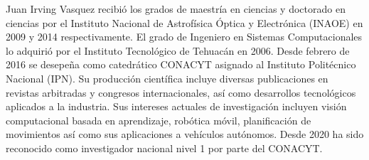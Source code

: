Juan Irving Vasquez recibió los grados de maestría en ciencias y doctorado en ciencias por el Instituto Nacional de Astrofísica Óptica y Electrónica (INAOE) en 2009 y 2014 respectivamente. El grado de Ingeniero en Sistemas Computacionales lo adquirió por el Instituto Tecnológico de Tehuacán en 2006. Desde febrero de 2016 se desepeña como catedrático CONACYT asignado al Instituto Politécnico Nacional (IPN). Su producción científica incluye diversas publicaciones en revistas arbitradas y congresos internacionales, así como desarrollos tecnológicos aplicados a la industria. Sus intereses actuales de investigación incluyen visión computacional basada en aprendizaje, robótica móvil, planificación de movimientos así como sus aplicaciones a vehículos autónomos. Desde 2020 ha sido reconocido como investigador nacional nivel 1 por parte del CONACYT.